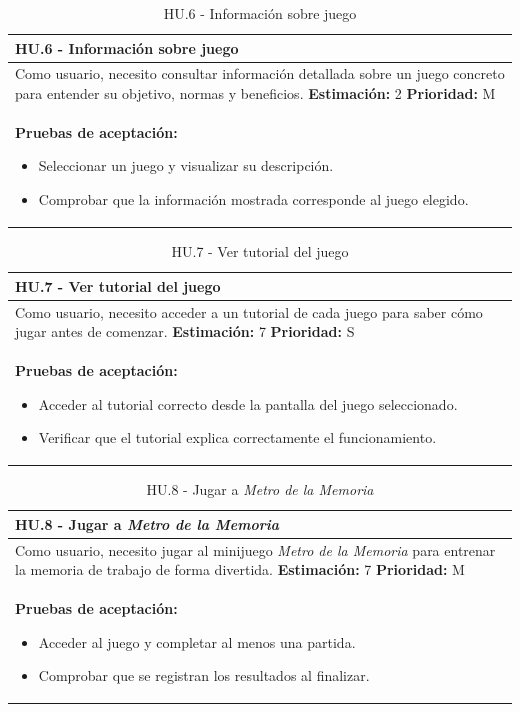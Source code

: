 \begin{table}[H]
\centering
\begin{tabularx}{\textwidth}{|X|}
\hline
\textbf{HU.6 - Información sobre juego}  \\
\hline
Como usuario, necesito consultar información detallada sobre un juego concreto para entender su objetivo, normas y beneficios.
\clearpage
\textbf{Estimación: }2
\clearpage
\textbf{Prioridad: }M
\\
\hline
\textbf{Pruebas de aceptación:}
\begin{itemize}
    \item Seleccionar un juego y visualizar su descripción.
    \item Comprobar que la información mostrada corresponde al juego elegido.
\end{itemize}
\\
\hline
\end{tabularx}
\caption{HU.6 - Información sobre juego}
\end{table}

\begin{table}[H]
\centering
\begin{tabularx}{\textwidth}{|X|}
\hline
\textbf{HU.7 - Ver tutorial del juego}  \\
\hline
Como usuario, necesito acceder a un tutorial de cada juego para saber cómo jugar antes de comenzar.
\clearpage
\textbf{Estimación: }7
\clearpage
\textbf{Prioridad: }S
\\
\hline
\textbf{Pruebas de aceptación:}
\begin{itemize}
    \item Acceder al tutorial correcto desde la pantalla del juego seleccionado.
    \item Verificar que el tutorial explica correctamente el funcionamiento.
\end{itemize}
\\
\hline
\end{tabularx}
\caption{HU.7 - Ver tutorial del juego}
\end{table}

\begin{table}[H]
\centering
\begin{tabularx}{\textwidth}{|X|}
\hline
\textbf{HU.8 - Jugar a \textit{Metro de la Memoria}}  \\
\hline
Como usuario, necesito jugar al minijuego \textit{Metro de la Memoria} para entrenar la memoria de trabajo de forma divertida.
\clearpage
\textbf{Estimación: }7
\clearpage
\textbf{Prioridad: }M
\\
\hline
\textbf{Pruebas de aceptación:}
\begin{itemize}
    \item Acceder al juego y completar al menos una partida.
    \item Comprobar que se registran los resultados al finalizar.
\end{itemize}
\\
\hline
\end{tabularx}
\caption{HU.8 - Jugar a \textit{Metro de la Memoria}}
\end{table}

